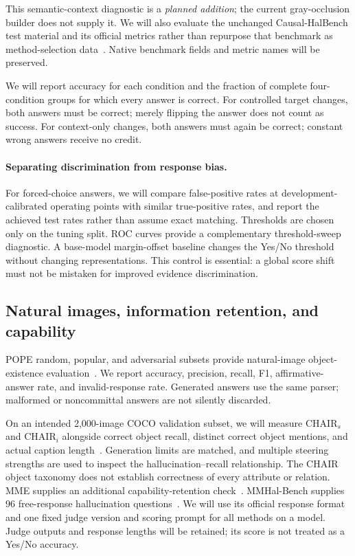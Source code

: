 This semantic-context diagnostic is a \emph{planned addition}; the current
gray-occlusion builder does not supply it. We will also evaluate the
unchanged Causal-HalBench test material and its official metrics rather
than repurpose that benchmark as method-selection data~\cite{causalhalbench}.
Native benchmark fields and metric names will be preserved.

We will report accuracy for each condition and the fraction of complete
four-condition groups for which every answer is correct. For controlled
target changes, both answers must be correct; merely flipping the answer
does not count as success. For context-only changes, both answers must
again be correct; constant wrong answers receive no credit.

\paragraph{Separating discrimination from response bias.}
For forced-choice answers, we will compare false-positive rates at
development-calibrated operating points with similar true-positive rates,
and report the achieved test rates rather than assume exact matching.
Thresholds are chosen only on the tuning split. ROC curves provide a
complementary threshold-sweep diagnostic. A base-model margin-offset
baseline changes the Yes/No threshold without changing representations.
This control is essential: a global score shift must not be mistaken for
improved evidence discrimination.

\subsection{Natural images, information retention, and capability}
POPE random, popular, and adversarial subsets provide natural-image
object-existence evaluation~\cite{pope}. We report accuracy, precision,
recall, F1, affirmative-answer rate, and invalid-response rate. Generated
answers use the same parser; malformed or noncommittal answers are not
silently discarded.

On an intended 2,000-image COCO validation subset, we will measure
CHAIR$_s$ and CHAIR$_i$ alongside correct object recall, distinct correct
object mentions, and actual caption length~\cite{chair,coco}.
Generation limits are matched, and multiple steering strengths are used to
inspect the hallucination--recall relationship. The CHAIR object taxonomy
does not establish correctness of every attribute or relation.
MME supplies an additional capability-retention check~\cite{mme}.
MMHal-Bench supplies 96 free-response hallucination questions~\cite{mmhal}.
We will use its official response format and one fixed judge version and
scoring prompt for all methods on a model. Judge outputs and response
lengths will be retained; its score is not treated as a Yes/No accuracy.

